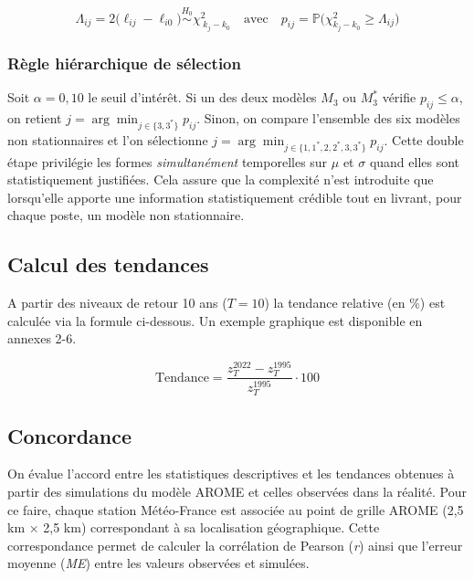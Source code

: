 \documentclass[
  article,
  nofooter,
  noheadings]{jss}
\begin{document}
\[
\Lambda_{ij}=2\bigl(\ell_{ij}-\ell_{i0}\bigr) \overset{H_0}{\sim}\chi^{2}_{\;k_j-k_0} \quad \text{avec} \quad p_{ij}= \mathbb{P}(\chi^{2}_{k_j-k_0}\ge \Lambda_{ij}\bigr)
\]

\subsubsection{Règle hiérarchique de
sélection}\label{ruxe8gle-hiuxe9rarchique-de-suxe9lection}

Soit \(\alpha=0{,}10\) le seuil d'intérêt. Si un des deux modèles
\(M_3\) ou \(M_3^\ast\) vérifie \(p_{ij}\le\alpha\), on retient
\(j=\arg\min_{j\in\{3,3^\ast\}} p_{ij}\). Sinon, on compare l'ensemble
des six modèles non stationnaires et l'on sélectionne
\(j=\arg\min_{j\in\{1,1^\ast,2,2^\ast,3,3^\ast\}} p_{ij}\). Cette double
étape privilégie les formes \emph{simultanément} temporelles sur \(\mu\)
et \(\sigma\) quand elles sont statistiquement justifiées. Cela assure
que la complexité n'est introduite que lorsqu'elle apporte une
information statistiquement crédible tout en livrant, pour chaque poste,
un modèle non stationnaire.

\subsection{Calcul des tendances}\label{calcul-des-tendances}

A partir des niveaux de retour 10 ans (\(T = 10\)) la tendance relative
(en \%) est calculée via la formule ci-dessous. Un exemple graphique est
disponible en annexes 2-6.

\begin{tcolorbox}[enhanced jigsaw, leftrule=.75mm, opacityback=0, breakable, toprule=.15mm, colframe=quarto-callout-color-frame, arc=.35mm, colback=white, rightrule=.15mm, bottomrule=.15mm, left=2mm]

\[
\text{Tendance} = \frac{z_T^{2022} - z_T^{1995}}{z_T^{1995}} \cdot {100}
\]

\end{tcolorbox}

\subsection{Concordance}\label{concordance}

On évalue l'accord entre les statistiques descriptives et les tendances
obtenues à partir des simulations du modèle AROME et celles observées
dans la réalité. Pour ce faire, chaque station Météo-France est associée
au point de grille AROME (2,5 km × 2,5 km) correspondant à sa
localisation géographique. Cette correspondance permet de calculer la
corrélation de Pearson (\emph{r}) ainsi que l'erreur moyenne (\emph{ME})
entre les valeurs observées et simulées.
\end{document}
